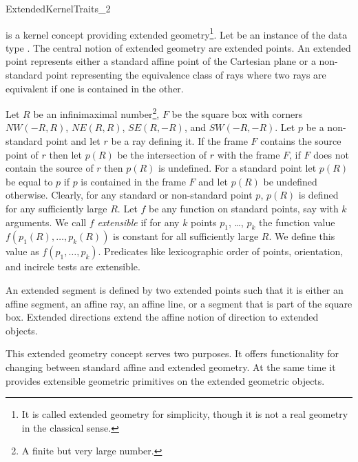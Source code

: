 
\begin{ccRefConcept}{ExtendedKernelTraits_2}

\ccDefinition

 is a kernel concept providing extended
geometry\footnote{It is called extended geometry for simplicity,
though it is not a real geometry in the classical sense.}. Let 
be an instance of the data type .  The
central notion of extended geometry are extended points. An extended
point represents either a standard affine point of the Cartesian plane
or a non-standard point representing the equivalence class of rays
where two rays are equivalent if one is contained in the other.

Let $R$ be an infinimaximal number\footnote{A finite but very large
number.}, $F$ be the square box with corners $NW(-R,R)$, $NE(R,R)$,
$SE(R,-R)$, and $SW(-R,-R)$. Let $p$ be a non-standard point and let
$r$ be a ray defining it. If the frame $F$ contains the source point
of $r$ then let $p(R)$ be the intersection of $r$ with the frame $F$,
if $F$ does not contain the source of $r$ then $p(R)$ is undefined.
For a standard point let $p(R)$ be equal to $p$ if $p$ is contained in
the frame $F$ and let $p(R)$ be undefined otherwise. Clearly, for any
standard or non-standard point $p$, $p(R)$ is defined for any
sufficiently large $R$. Let $f$ be any function on standard points,
say with $k$ arguments. We call $f$ {\em extensible} if for any $k$
points $p_1$, \ldots, $p_k$ the function value
$f(p_1(R),\ldots,p_k(R))$ is constant for all sufficiently large
$R$. We define this value as $f(p_1,\ldots,p_k)$.  Predicates like
lexicographic order of points, orientation, and incircle tests are
extensible.

An extended segment is defined by two extended points such that it is
either an affine segment, an affine ray, an affine line, or a segment
that is part of the square box. Extended directions extend the affine
notion of direction to extended objects.

This extended geometry concept serves two purposes. It offers
functionality for changing between standard affine and extended
geometry. At the same time it provides extensible geometric primitives
on the extended geometric objects.

\ccSetOneOfTwoColumns{7cm}

\ccTypes


\end{ccRefConcept}

